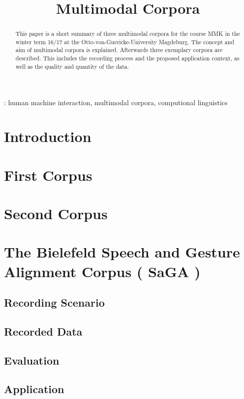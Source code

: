 \documentclass[a4paper]{article}
\title{Multimodal Corpora}
\begin{document}
	\maketitle
  	\begin{abstract}
    	This paper is a short summary of three multimodal corpora for the course MMK in the winter term 16/17 at the Otto-von-Guericke-University Magdeburg. The concept and aim of multimodal corpora is explained. Afterwards three exemplary corpora are described. This includes the recording process and the proposed application context, as well as the quality and quantity of the data.
  	\end{abstract}
  	: human machine interaction, multimodal corpora, computional linguistics

	
  	\section{Introduction}

	\section{First Corpus}
	
	\section{Second Corpus}
	
	\section{The Bielefeld Speech and Gesture Alignment Corpus ( SaGA )}
	
		\subsection{Recording Scenario}
		
		\subsection{Recorded Data}
		
		\subsection{Evaluation}
		
		\subsection{Application}

  	\newpage
  	\eightpt
  	

  	
\end{document}
